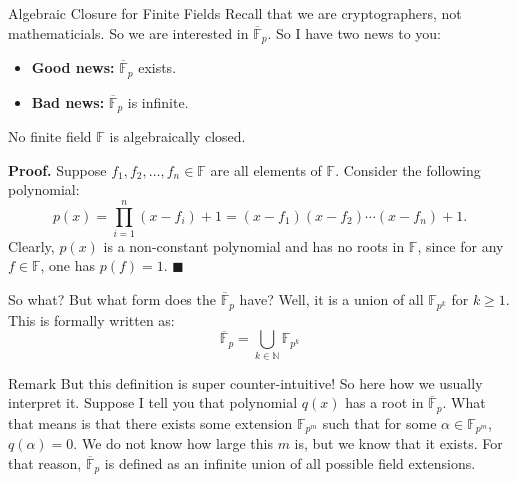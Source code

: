 \documentclass{beamer}
\begin{document}
    \begin{frame}{Algebraic Closure for Finite Fields}
        Recall that we are cryptographers, not mathematicials. So we are interested in $\overline{\mathbb{F}}_p$. So I have two news to you:\pause
        \begin{itemize}
            \item \textbf{Good news:} $\overline{\mathbb{F}}_p$ exists.\pause
            \item \textbf{Bad news:} $\overline{\mathbb{F}}_p$ is infinite.\pause
        \end{itemize}

        \begin{theorem}
            No finite field $\mathbb{F}$ is algebraically closed.\pause
        \end{theorem}
        
        \textbf{Proof.} Suppose $f_1,f_2,\dots,f_n \in \mathbb{F}$ are all elements of $\mathbb{F}$. Consider the following polynomial:
        \begin{equation*}
            p(x) = \prod_{i=1}^n (x-f_i)+1 = (x-f_1)(x-f_2)\cdots(x-f_n)+1.
        \end{equation*}
        \pause Clearly, $p(x)$ is a non-constant polynomial and has no roots in $\mathbb{F}$, since for any $f \in \mathbb{F}$, one has $p(f)=1$. $\blacksquare$
    \end{frame}

    \begin{frame}{So what?}
        But what form does the $\overline{\mathbb{F}}_{p}$ have? Well, it is a union of all $\mathbb{F}_{p^k}$ for $k \geq 1$. This is formally written as:
        \begin{equation*}
            \boxed{\overline{\mathbb{F}}_{p} = \bigcup_{k \in \mathbb{N}} \mathbb{F}_{p^k}}
        \end{equation*} 

        \pause

        \begin{block}{Remark}
            But this definition is super counter-intuitive! So here how we usually interpret it. Suppose I tell you that polynomial $q(x)$ has a root in $\overline{\mathbb{F}}_p$. What that means is that there exists some extension $\mathbb{F}_{p^m}$ such that for some $\alpha \in \mathbb{F}_{p^m}$, $q(\alpha)=0$. We do not know how large this $m$ is, but we know that it exists. For that reason, $\overline{\mathbb{F}}_p$ is defined as an infinite union of all possible field extensions.
        \end{block}
    \end{frame}
\end{document}
